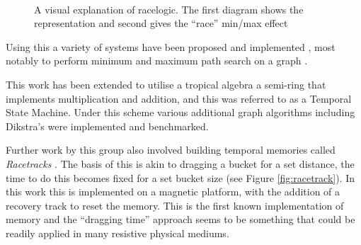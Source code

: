 \documentclass{article}
\begin{document}
\begin{figure}[ht]
  \centering
  \\
  \caption{A visual explanation of racelogic. The first diagram shows the representation and second gives the ``race'' min/max effect}
  \label{fig:race}
\end{figure}


Using this a variety of systems have been proposed and implemented \cite{madhavan2014race}, most notably to perform minimum and maximum path search on a graph \cite{madhavan2015race}. 

This work has been extended to utilise a tropical algebra \cite{madhavan2021temporal} a semi-ring that implements multiplication and addition, and this was referred to as a Temporal State Machine. Under this scheme various additional graph algorithms including Dikstra's were implemented and benchmarked. 

Further work by this group also involved building temporal memories called \textit{Racetracks} \cite{vakili2020temporal,madhavan2020storing}. The basis of this is akin to dragging a bucket for a set distance, the time to do this becomes fixed for a set bucket size (see Figure \ref{fig:racetrack}). In this work this is implemented on a magnetic platform, with the addition of a recovery track to reset the memory. This is the first known implementation of memory and the ``dragging time'' approach seems to be something that could be readily applied in many resistive physical mediums.
\end{document}
